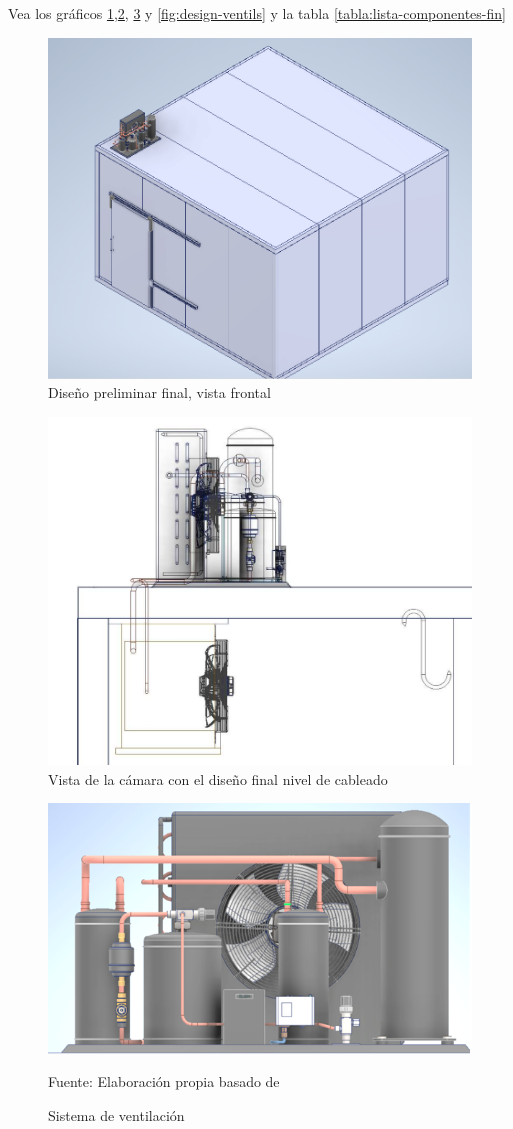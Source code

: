 Vea los gráficos \ref{fig:final1},\ref{fig:plano-fin}, \ref{fig:design-enfria-fin} y \ref{fig:design-ventils} y la tabla \ref{tabla:lista-componentes-fin}


\begin{figure}[H]
	\centering
	\includegraphics[width=0.6\linewidth]{figures/final1}
	\caption{Diseño preliminar final, vista frontal}
	\label{fig:final1}
\end{figure}



\begin{figure}[H]
	\centering
	\includegraphics[width=0.6\linewidth]{figures/axo-design-cableado}
	\caption{Vista de la cámara con el diseño final nivel de cableado}
	\label{fig:plano-fin}
\end{figure}


\begin{figure}[H]
	\centering
	\includegraphics[width=0.46\linewidth]{figures/design-enfria}
	\caption{Sistema de ventilación}
	\label{fig:design-enfria-fin}  Fuente: Elaboración propia basado de 
\end{figure}

